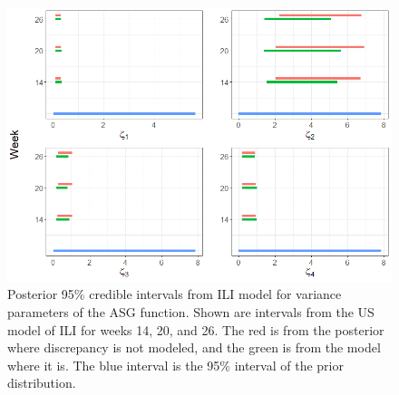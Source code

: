 \documentclass[ba]{imsart}
\theoremstyle{plain}
\theoremstyle{definition}
\theoremstyle{remark}
\begin{document}
\begin{supplement}
\begin{figure}[hbt!]
    \centering
    \includegraphics[scale=.6]{Images/posterior_zeta.png}
    \caption{Posterior 95\% credible intervals from ILI model for variance parameters of the ASG function. Shown are intervals from the US model of ILI for weeks 14, 20, and 26. The red is from the posterior where discrepancy is not modeled, and the green is from the model where it is. The blue interval is the 95\% interval of the prior distribution.}
    \label{fig:posterior_zeta}
\end{figure}


\end{supplement}
\end{document}
